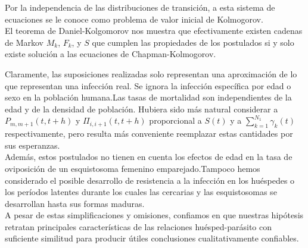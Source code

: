 Por la independencia de las distribuciones de transición, a esta sistema de ecuaciones se le conoce como problema de valor inicial de Kolmogorov.\\ El teorema de Daniel-Kolgomorov nos muestra que efectivamente existen cadenas de Markov $M_k$, $F_k$, y $S$ que cumplen las propiedades de los postulados si y solo existe solución a las ecuaciones de Chapman-Kolmogorov.
\begin{Obs}
    Claramente, las suposiciones realizadas solo representan una aproximación de lo que representan una infección real. Se ignora la infección específica por edad o sexo en la población humana.Las tasas de mortalidad son independientes de la edad y de la densidad de población. Hubiera sido más natural considerar a $P_{m,m+1}(t,t+h)$ y $\Pi_{i,i+1}(t,t+h)$ proporcional a $S(t)$ y a $\sum_{k=1}^{N_1}\gamma_k(t)$ respectivamente, pero resulta más conveniente reemplazar estas cantidades por sus esperanzas.\\
    Además, estos postulados no tienen en cuenta los efectos de edad en la tasa de oviposición de un esquistosoma femenino emparejado.Tampoco hemos considerado el posible desarrollo de resistencia a la infección en los huéspedes o los períodos latentes durante los cuales las cercarias y las esquistosomas se desarrollan hasta sus formas maduras.\\A pesar de estas simplificaciones y omisiones, confiamos en que nuestras hipótesis retratan principales
    características de las relaciones huésped-parásito con suficiente similitud para producir útiles conclusiones cualitativamente confiables.
\end{Obs}